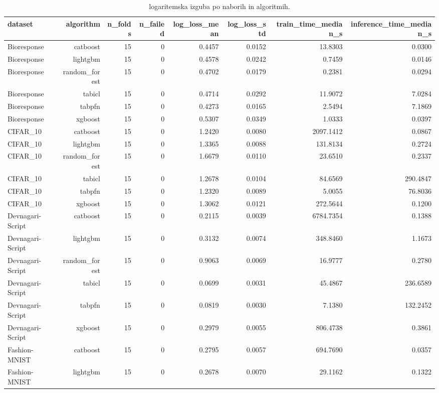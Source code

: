 \begin{table}[htbp]
\centering
\caption{logaritemska izguba po naborih in algoritmih.}
\label{tab:per-dataset}
\begin{tabular}{lrrrrrrr}
\hline
dataset & algorithm & n\_folds & n\_failed & log\_loss\_mean & log\_loss\_std & train\_time\_median\_s & inference\_time\_median\_s \\
\hline
Bioresponse & catboost & 15 & 0 & 0.4457 & 0.0152 & 13.8303 & 0.0300 \\
Bioresponse & lightgbm & 15 & 0 & 0.4578 & 0.0242 & 0.7459 & 0.0146 \\
Bioresponse & random\_forest & 15 & 0 & 0.4702 & 0.0179 & 0.2381 & 0.0294 \\
Bioresponse & tabicl & 15 & 0 & 0.4714 & 0.0292 & 11.9072 & 7.0284 \\
Bioresponse & tabpfn & 15 & 0 & 0.4273 & 0.0165 & 2.5494 & 7.1869 \\
Bioresponse & xgboost & 15 & 0 & 0.5307 & 0.0349 & 1.0333 & 0.0397 \\
CIFAR\_10 & catboost & 15 & 0 & 1.2420 & 0.0080 & 2097.1412 & 0.0867 \\
CIFAR\_10 & lightgbm & 15 & 0 & 1.3365 & 0.0088 & 131.8134 & 0.2724 \\
CIFAR\_10 & random\_forest & 15 & 0 & 1.6679 & 0.0110 & 23.6510 & 0.2337 \\
CIFAR\_10 & tabicl & 15 & 0 & 1.2678 & 0.0104 & 84.6569 & 290.4847 \\
CIFAR\_10 & tabpfn & 15 & 0 & 1.2320 & 0.0089 & 5.0055 & 76.8036 \\
CIFAR\_10 & xgboost & 15 & 0 & 1.3062 & 0.0121 & 272.5644 & 0.1200 \\
Devnagari-Script & catboost & 15 & 0 & 0.2115 & 0.0039 & 6784.7354 & 0.1388 \\
Devnagari-Script & lightgbm & 15 & 0 & 0.3132 & 0.0074 & 348.8460 & 1.1673 \\
Devnagari-Script & random\_forest & 15 & 0 & 0.9063 & 0.0069 & 16.9777 & 0.2780 \\
Devnagari-Script & tabicl & 15 & 0 & 0.0699 & 0.0031 & 45.4867 & 236.6589 \\
Devnagari-Script & tabpfn & 15 & 0 & 0.0819 & 0.0030 & 7.1380 & 132.2452 \\
Devnagari-Script & xgboost & 15 & 0 & 0.2979 & 0.0055 & 806.4738 & 0.3861 \\
Fashion-MNIST & catboost & 15 & 0 & 0.2795 & 0.0057 & 694.7690 & 0.0357 \\
Fashion-MNIST & lightgbm & 15 & 0 & 0.2678 & 0.0070 & 29.1162 & 0.1322 \\

\end{tabular}
\end{table}
